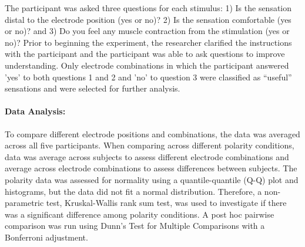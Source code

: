 \documentclass[10pt]{iopart}
\begin{document}
The participant was asked three questions for each stimulus: 1) Is the sensation distal to the electrode position (yes or no)?  2) Is the sensation comfortable (yes or no)? and 3) Do you feel any muscle contraction from the stimulation (yes or no)? Prior to beginning the experiment, the researcher clarified the instructions with the participant and the participant was able to ask questions to improve understanding. Only electrode combinations in which the participant answered 'yes' to both questions 1 and 2 and 'no' to question 3 were classified as ``useful'' sensations and were selected for further analysis.

\paragraph{Data Analysis:}
To compare different electrode positions and combinations, the data was averaged across all five participants. When comparing across different polarity conditions, data was average across subjects to assess different electrode combinations and average across electrode combinations to assess differences between subjects. The polarity data was assessed for normality using a quantile-quantile (Q-Q) plot and histograms, but the data did not fit a normal distribution. Therefore, a non-parametric test, Kruskal-Wallis rank sum test, was used to investigate if there was a significant difference among polarity conditions. A post hoc pairwise comparison was run using Dunn’s Test for Multiple Comparisons with a Bonferroni adjustment. 
\end{document}
